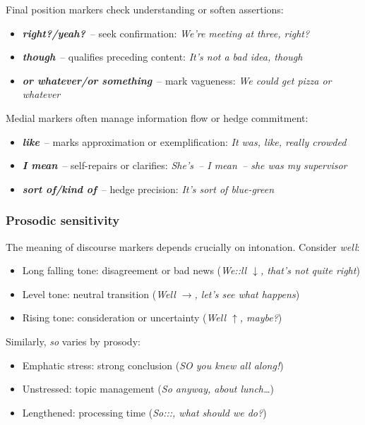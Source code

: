 Final position markers check understanding or soften assertions:

\begin{itemize}[noitemsep]
   \item \textbf{\textit{right?/yeah?}}~-- seek confirmation: \textit{We're meeting at three, right?}
   \item \textbf{\textit{though}}~-- qualifies preceding content: \textit{It's not a bad idea, though}
   \item \textbf{\textit{or whatever/or something}}~-- mark vagueness: \textit{We could get pizza or whatever}
\end{itemize}

Medial markers often manage information flow or hedge commitment:

\begin{itemize}[noitemsep]
   \item \textbf{\textit{like}}~-- marks approximation or exemplification: \textit{It was, like, really crowded}
   \item \textbf{\textit{I mean}}~-- self-repairs or clarifies: \textit{She's~-- I mean~-- she was my supervisor}
   \item \textbf{\textit{sort of/kind of}}~-- hedge precision: \textit{It's sort of blue-green}
\end{itemize}

\subsubsection*{Prosodic sensitivity}

The meaning of discourse markers depends crucially on intonation. Consider \textit{well}:

\begin{itemize}[noitemsep]
   \item Long falling tone: disagreement or bad news (\textit{We::ll $\downarrow$, that's not quite right})
   \item Level tone: neutral transition (\textit{Well $\rightarrow$, let's see what happens})
   \item Rising tone: consideration or uncertainty (\textit{Well $\uparrow$, maybe?})
\end{itemize}

Similarly, \textit{so} varies by prosody:
\begin{itemize}[noitemsep]
   \item Emphatic stress: strong conclusion (\textit{SO you knew all along!})
   \item Unstressed: topic management (\textit{So anyway, about lunch\dots})
   \item Lengthened: processing time (\textit{So:::, what should we do?})
\end{itemize}

